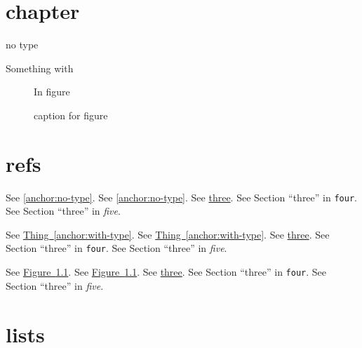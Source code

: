 \documentclass{book}
\newcommand{\Texinfothechapterheading}{}
\newcommand{\Texinfoheadingchaptername}{\chaptername}
\newcommand{\Texinfochapter}[1]{\chapter{#1}
\renewcommand{\Texinfothechapterheading}{\Texinfoheadingchaptername{} \thechapter{} }%
}%
\renewcommand{\_}{\Texinfounderscore\discretionary{}{}{}}
\begin{document}
\label{anchor:Top}%
\Texinfochapter{{chapter}}
\label{anchor:chapter}%

\begin{TexinfoFloat}
no type
\caption[short no type float]{no type float}
\label{anchor:no-type}%
\end{TexinfoFloat}

\begin{TexinfoFloatThing}
Something with
\caption[short with type float]{with type float}
\label{anchor:with-type}%
\end{TexinfoFloatThing}

\begin{figure}
In figure
\caption[short caption for figure]{caption for figure}
\label{anchor:my-figure}%
\end{figure}

\Texinfochapter{{refs}}
\label{anchor:refs}%

See \hyperref[anchor:no-type]{\ref*{anchor:no-type}}.
See \hyperref[anchor:no-type]{\ref*{anchor:no-type}}.
See \hyperref[anchor:no-type]{three}.
See Section ``three'' in \texttt{four}.
See Section ``three'' in \textsl{five}.

See \hyperref[anchor:with-type]{Thing~\ref*{anchor:with-type}}.
See \hyperref[anchor:with-type]{Thing~\ref*{anchor:with-type}}.
See \hyperref[anchor:with-type]{three}.
See Section ``three'' in \texttt{four}.
See Section ``three'' in \textsl{five}.

See \hyperref[anchor:my-figure]{Figure~\ref*{anchor:my-figure}}.
See \hyperref[anchor:my-figure]{Figure~\ref*{anchor:my-figure}}.
See \hyperref[anchor:my-figure]{three}.
See Section ``three'' in \texttt{four}.
See Section ``three'' in \textsl{five}.

\Texinfochapter{{lists}}
\label{anchor:lists}%

\listoffigures
{}
\end{document}
